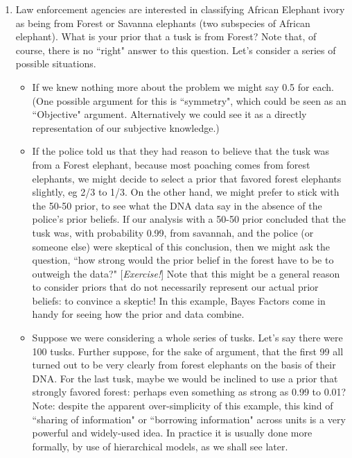 \documentclass[12pt]{article}
\begin{document}
\begin{enumerate}
  \item Law enforcement agencies are interested in classifying African Elephant ivory as being from Forest or Savanna elephants (two subspecies of African elephant). What is your prior that a tusk is from Forest? Note that, of course, there is no ``right" answer to this question. Let's consider a series of possible situations. 
  \begin{itemize}
  \item If we knew nothing more about the problem we might say 0.5 for each. (One possible argument for this is ``symmetry", which could
  be seen as an ``Objective" argument. Alternatively we could see it as a directly representation of our subjective knowledge.)
  \item If the police told us that they had reason to believe that the tusk was from a Forest elephant, because most poaching comes from forest elephants, we might decide to select a prior that favored forest elephants slightly, eg 2/3 to 1/3. On the other hand, we might prefer to stick with the 50-50 prior, to see what the DNA data say in the absence of the police's prior beliefs. If our analysis with a 50-50 prior concluded that the tusk was, with probability 0.99, from savannah, and the police (or someone else) were skeptical of this conclusion, then we might ask the question, ``how strong would the prior belief in the forest have to be to outweigh the data?" [{\it Exercise!}] Note that this might be a general reason to consider priors that do not necessarily represent our actual prior beliefs: to convince a skeptic! In this example, Bayes Factors come in handy for seeing how the prior and data combine.
  \item Suppose we were considering a whole series of tusks. Let's say there were 100 tusks.
  Further suppose, for the sake of argument, that the first 99 all turned
  out to be very clearly from forest elephants
  on the basis of their DNA.  For the last tusk, maybe we would be inclined to use a prior that strongly favored forest: perhaps even something as strong as 0.99 to 0.01? Note: despite the apparent over-simplicity of this example, this kind of ``sharing of information" or ``borrowing information" across units is a very powerful and
  widely-used idea. In practice it is usually done more formally, by use of hierarchical models, as we shall see later.
\end{itemize}  
  

\end{enumerate}
\end{document}
